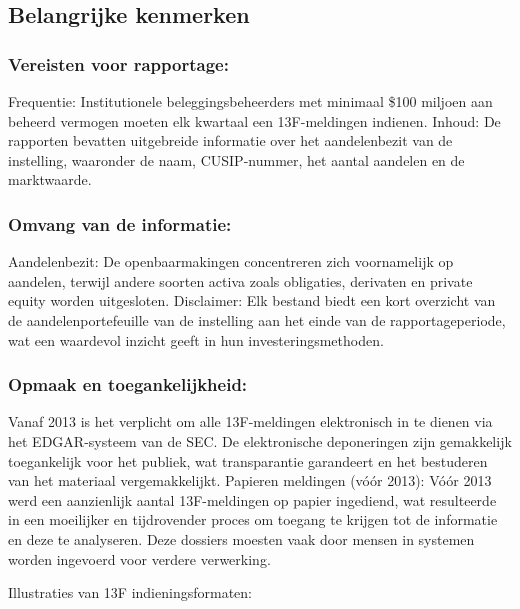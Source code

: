 \subsection{Belangrijke kenmerken}

\subsubsection{Vereisten voor rapportage:}

Frequentie: Institutionele beleggingsbeheerders met minimaal \$100 miljoen aan beheerd vermogen moeten elk kwartaal een 13F-meldingen indienen.
Inhoud: De rapporten bevatten uitgebreide informatie over het aandelenbezit van de instelling, waaronder de naam, CUSIP-nummer, het aantal aandelen en de marktwaarde.
\subsubsection{Omvang van de informatie:}

Aandelenbezit: De openbaarmakingen concentreren zich voornamelijk op aandelen, terwijl andere soorten activa zoals obligaties, derivaten en private equity worden uitgesloten.
Disclaimer: Elk bestand biedt een kort overzicht van de aandelenportefeuille van de instelling aan het einde van de rapportageperiode, wat een waardevol inzicht geeft in hun investeringsmethoden.
\subsubsection{Opmaak en toegankelijkheid:}

Vanaf 2013 is het verplicht om alle 13F-meldingen elektronisch in te dienen via het EDGAR-systeem van de SEC. De elektronische deponeringen zijn gemakkelijk toegankelijk voor het publiek, wat transparantie garandeert en het bestuderen van het materiaal vergemakkelijkt.
Papieren meldingen (vóór 2013): Vóór 2013 werd een aanzienlijk aantal 13F-meldingen op papier ingediend, wat resulteerde in een moeilijker en tijdrovender proces om toegang te krijgen tot de informatie en deze te analyseren. Deze dossiers moesten vaak door mensen in systemen worden ingevoerd voor verdere verwerking.

Illustraties van 13F indieningsformaten:

